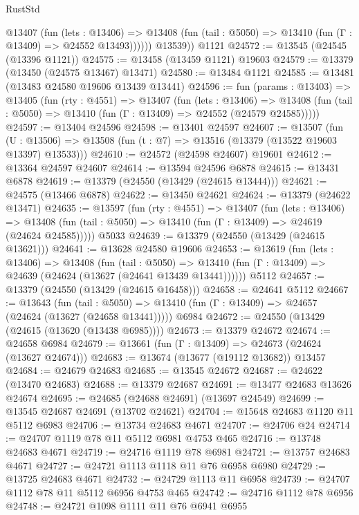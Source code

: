 \begin{lexlean}{RustStd}
\begin{coremodule}
            @13407
              (fun (lets : @13406) =>
              @13408 (fun (tail : @5050) => @13410 (fun (Γ : @13409) => @24552 @13493))))))
        @13539))
    @1121
@24572 := @13545 (@24545 (@13396 @1121))
@24575 := @13458 (@13459 @1121) @19603
@24579 := @13379 (@13450 (@24575 @13467) @13471)
@24580 := @13484 @1121
@24585 := @13481 (@13483 @24580 @19606 @13439 @13441)
@24596 := fun (params : @13403) =>
  @13405
    (fun (rty : @4551) =>
    @13407
      (fun (lets : @13406) =>
      @13408 (fun (tail : @5050) => @13410 (fun (Γ : @13409) => @24552 (@24579 @24585)))))
@24597 := @13404 @24596
@24598 := @13401 @24597
@24607 := @13507
    (fun (U : @13506) => @13508 (fun (t : @7) => @13516 (@13379 (@13522 @19603 @13397) @13533)))
@24610 := @24572 (@24598 @24607) @19601
@24612 := @13364 @24597 @24607
@24614 := @13594 @24596 @6878
@24615 := @13431 @6878
@24619 := @13379 (@24550 (@13429 (@24615 @13444)))
@24621 := @24575 (@13466 @6878)
@24622 := @13450 @24621
@24624 := @13379 (@24622 @13471)
@24635 := @13597
    (fun (rty : @4551) =>
    @13407
      (fun (lets : @13406) =>
      @13408 (fun (tail : @5050) => @13410 (fun (Γ : @13409) => @24619 (@24624 @24585)))))
    @5033
@24639 := @13379 (@24550 (@13429 (@24615 @13621)))
@24641 := @13628 @24580 @19606
@24653 := @13619
    (fun (lets : @13406) =>
    @13408
      (fun (tail : @5050) =>
      @13410 (fun (Γ : @13409) => @24639 (@24624 (@13627 (@24641 @13439 @13441))))))
    @5112
@24657 := @13379 (@24550 (@13429 (@24615 @16458)))
@24658 := @24641 @5112
@24667 := @13643
    (fun (tail : @5050) => @13410 (fun (Γ : @13409) => @24657 (@24624 (@13627 (@24658 @13441)))))
    @6984
@24672 := @24550 (@13429 (@24615 (@13620 (@13438 @6985))))
@24673 := @13379 @24672
@24674 := @24658 @6984
@24679 := @13661 (fun (Γ : @13409) => @24673 (@24624 (@13627 @24674)))
@24683 := @13674 (@13677 (@19112 @13682)) @13457
@24684 := @24679 @24683
@24685 := @13545 @24672
@24687 := @24622 (@13470 @24683)
@24688 := @13379 @24687
@24691 := @13477 @24683 @13626 @24674
@24695 := @24685 (@24688 @24691) (@13697 @24549)
@24699 := @13545 @24687 @24691 (@13702 @24621)
@24704 := @15648 @24683 @1120 @11 @5112 @6983
@24706 := @13734 @24683 @4671
@24707 := @24706 @24
@24714 := @24707 @1119 @78 @11 @5112 @6981 @4753 @465
@24716 := @13748 @24683 @4671
@24719 := @24716 @1119 @78 @6981
@24721 := @13757 @24683 @4671
@24727 := @24721 @1113 @1118 @11 @76 @6958 @6980
@24729 := @13725 @24683 @4671
@24732 := @24729 @1113 @11 @6958
@24739 := @24707 @1112 @78 @11 @5112 @6956 @4753 @465
@24742 := @24716 @1112 @78 @6956
@24748 := @24721 @1098 @1111 @11 @76 @6941 @6955

\end{coremodule}
\end{lexlean}
